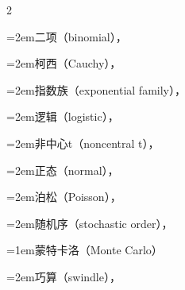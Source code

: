 \begin{multicols}{2}
\par\noindent\hangindent=2em\hspace*{1em}\label{idx:701}二项（binomial），\hyperref[exercise:8.25]{\pageref*{exercise:8.25}}\par
\par\noindent\hangindent=2em\hspace*{1em}\label{idx:702}柯西（Cauchy），\hyperref[exercise:8.29]{\pageref*{exercise:8.29}}\par
\par\noindent\hangindent=2em\hspace*{1em}\label{idx:703}指数族（exponential family），\hyperref[exercise:8.27]{\pageref*{exercise:8.27}}\par
\par\noindent\hangindent=2em\hspace*{1em}\label{idx:704}逻辑（logistic），\hyperref[exercise:8.28]{\pageref*{exercise:8.28}}\par
\par\noindent\hangindent=2em\hspace*{1em}\label{idx:705}非中心t（noncentral t），\hyperref[exercise:8.35]{\pageref*{exercise:8.35}}\par
\par\noindent\hangindent=2em\hspace*{1em}\label{idx:706}正态（normal），\hyperref[exercise:8.25]{\pageref*{exercise:8.25}}\par
\par\noindent\hangindent=2em\hspace*{1em}\label{idx:707}泊松（Poisson），\hyperref[exercise:8.25]{\pageref*{exercise:8.25}}\par
\par\noindent\hangindent=2em\hspace*{1em}\label{idx:708}随机序（stochastic order），\hyperref[exercise:8.26]{\pageref*{exercise:8.26}}\par
\par\addvspace{2pt}
\par\noindent\hangindent=1em\hspace*{0em}\label{idx:709}蒙特卡洛（Monte Carlo）\par
\par\noindent\hangindent=2em\hspace*{1em}\label{idx:710}巧算（swindle），\hyperref[exercise:6.31]{\pageref*{exercise:6.31}}\par

\end{multicols}
